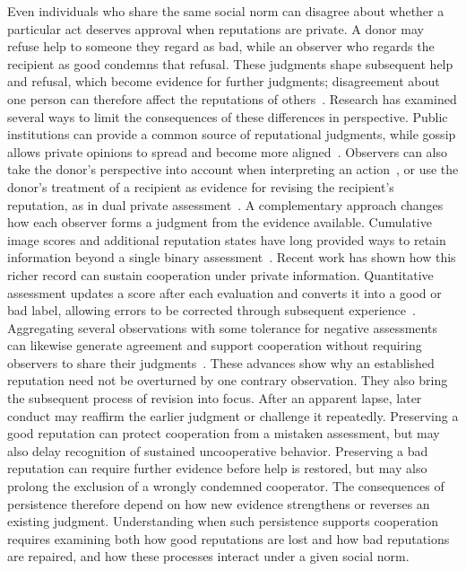 \documentclass[fleqn,10pt]{wlscirep}
\begin{document}
Even individuals who share the same social norm can disagree about whether a particular act deserves approval when reputations are private. A donor may refuse help to someone they regard as bad, while an observer who regards the recipient as good condemns that refusal. These judgments shape subsequent help and refusal, which become evidence for further judgments; disagreement about one person can therefore affect the reputations of others~\cite{hilbe2018,fujimoto2022,kessinger2023}. Research has examined several ways to limit the consequences of these differences in perspective. Public institutions can provide a common source of reputational judgments, while gossip allows private opinions to spread and become more aligned~\cite{radzvilavicius2021,kawakatsu2024}. Observers can also take the donor's perspective into account when interpreting an action~\cite{radzvilavicius2019}, or use the donor's treatment of a recipient as evidence for revising the recipient's reputation, as in dual private assessment~\cite{tham2026}. A complementary approach changes how each observer forms a judgment from the evidence available. Cumulative image scores and additional reputation states have long provided ways to retain information beyond a single binary assessment~\cite{nowak1998,tanabe2013,murase2022}. Recent work has shown how this richer record can sustain cooperation under private information. Quantitative assessment updates a score after each evaluation and converts it into a good or bad label, allowing errors to be corrected through subsequent experience~\cite{schmid2023}. Aggregating several observations with some tolerance for negative assessments can likewise generate agreement and support cooperation without requiring observers to share their judgments~\cite{michelmata2024}. These advances show why an established reputation need not be overturned by one contrary observation. They also bring the subsequent process of revision into focus. After an apparent lapse, later conduct may reaffirm the earlier judgment or challenge it repeatedly. Preserving a good reputation can protect cooperation from a mistaken assessment, but may also delay recognition of sustained uncooperative behavior. Preserving a bad reputation can require further evidence before help is restored, but may also prolong the exclusion of a wrongly condemned cooperator. The consequences of persistence therefore depend on how new evidence strengthens or reverses an existing judgment. Understanding when such persistence supports cooperation requires examining both how good reputations are lost and how bad reputations are repaired, and how these processes interact under a given social norm.
\end{document}

